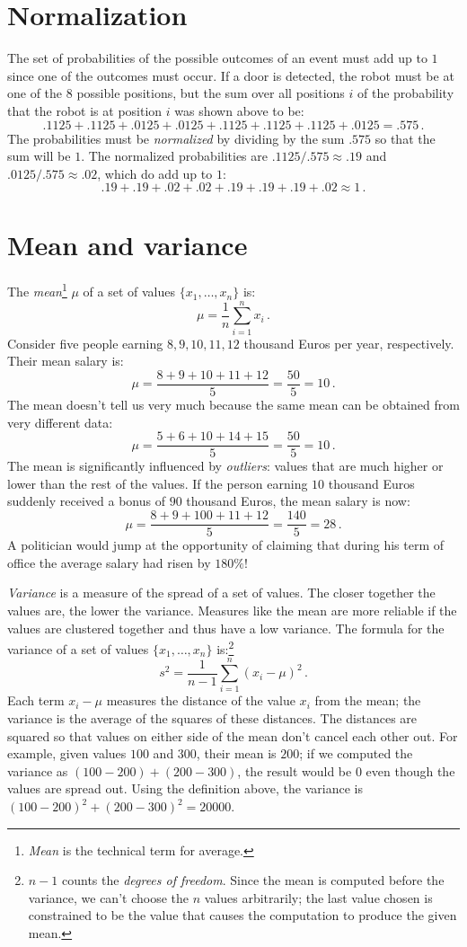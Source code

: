 \section{Normalization}\label{a.normalize}

The set of probabilities of the possible outcomes of an event must add up to $1$ since one of the outcomes must occur. If a door is detected, the robot must be at one of the $8$ possible positions, but the sum over all positions $i$ of the probability that the robot is at position $i$ was shown above to be:
\[
.1125 + .1125 + .0125 + .0125 + .1125 + .1125 + .1125 + .0125 = .575\,.
\]
The probabilities must be \emph{normalized} by dividing by the sum $.575$ so that the sum will be $1$. The normalized probabilities are $.1125/.575\approx .19$ and  $.0125/.575\approx .02$, which do add up to $1$:
\[.19 + .19 + .02 + .02 + .19 + .19 + .19 + .02 \approx 1\,.\]

\section{Mean and variance}\label{a.mean}

The \emph{mean}\footnote{\textit{Mean} is the technical term for average.} $\mu$ of a set of values $\{x_1,\ldots,x_n\}$ is:
\[
\mu = \frac{1}{n}\sum^n_{i=1} x_i\,.
\]
Consider five people earning $8,9,10,11,12$ thousand Euros per year, respectively. Their mean salary is:
\[
\mu = \frac{8+9+10+11+12}{5} = \frac{50}{5} = 10\,.
\]
The mean doesn't tell us very much because the same mean can be obtained from very different data:
\[
\mu = \frac{5+6+10+14+15}{5} = \frac{50}{5} = 10\,.
\]
The mean is significantly influenced by \emph{outliers}: values that are much higher or lower than the rest of the values. If the person earning $10$ thousand Euros suddenly received a bonus of $90$ thousand Euros, the mean salary is now:
\[
\mu = \frac{8+9+100+11+12}{5} = \frac{140}{5} = 28\,.
\]
A politician would jump at the opportunity of claiming that during his term of office the average salary had risen by $180\%$!

\emph{Variance} is a measure of the spread of a set of values. The closer together the values are, the lower the variance. Measures like the mean are more reliable if the values are clustered together and thus have a low variance. The formula for the variance of a set of values $\{x_1,\ldots,x_n\}$ is:\footnote{$n-1$ counts the \emph{degrees of freedom}. Since the mean is computed before the variance, we can't choose the $n$ values arbitrarily; the last value chosen is constrained to be the value that causes the computation to produce the given mean.}
\[
s^2 = \frac{1}{n-1}\sum^n_{i=1} (x_i-\mu)^2\,.
\]
Each term $x_i-\mu$ measures the distance of the value $x_i$ from the mean; the variance is the average of the squares of these distances. The distances are squared so that values on either side of the mean don't cancel each other out. For example, given values $100$ and $300$, their mean is $200$; if we computed the variance as $(100-200)+(200-300)$, the result would be $0$ even though the values are spread out. Using the definition above, the variance is $(100-200)^2+(200-300)^2=20000$.

